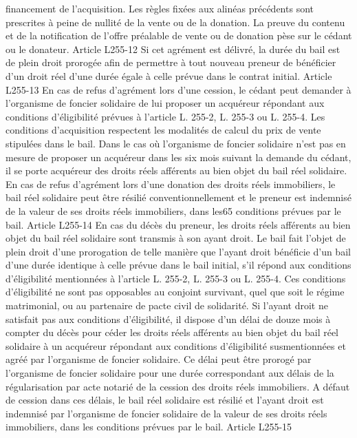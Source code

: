 \documentclass[11pt,a4paper]{report}
\begin{document}
financement de l'acquisition.
Les règles fixées aux alinéas précédents sont prescrites à peine de nullité de la vente ou de la donation. La
preuve du contenu et de la notification de l'offre préalable de vente ou de donation pèse sur le cédant ou le
donateur.
Article L255-12
Si cet agrément est délivré, la durée du bail est de plein droit prorogée afin de permettre à tout nouveau preneur
de bénéficier d'un droit réel d'une durée égale à celle prévue dans le contrat initial.
Article L255-13
En cas de refus d'agrément lors d'une cession, le cédant peut demander à l'organisme de foncier solidaire de lui
proposer un acquéreur répondant aux conditions d'éligibilité prévues à l'article L. 255-2, L. 255-3 ou L. 255-4.
Les conditions d'acquisition respectent les modalités de calcul du prix de vente stipulées dans le bail. Dans le
cas où l'organisme de foncier solidaire n'est pas en mesure de proposer un acquéreur dans les six mois suivant
la demande du cédant, il se porte acquéreur des droits réels afférents au bien objet du bail réel solidaire.
En cas de refus d'agrément lors d'une donation des droits réels immobiliers, le bail réel solidaire peut être
résilié conventionnellement et le preneur est indemnisé de la valeur de ses droits réels immobiliers, dans les65
conditions prévues par le bail.
Article L255-14
En cas du décès du preneur, les droits réels afférents au bien objet du bail réel solidaire sont transmis à son
ayant droit. Le bail fait l'objet de plein droit d'une prorogation de telle manière que l'ayant droit bénéficie d'un
bail d'une durée identique à celle prévue dans le bail initial, s'il répond aux conditions d'éligibilité mentionnées
à l'article L. 255-2, L. 255-3 ou L. 255-4.
Ces conditions d'éligibilité ne sont pas opposables au conjoint survivant, quel que soit le régime matrimonial, ou
au partenaire de pacte civil de solidarité.
Si l'ayant droit ne satisfait pas aux conditions d'éligibilité, il dispose d'un délai de douze mois à compter du
décès pour céder les droits réels afférents au bien objet du bail réel solidaire à un acquéreur répondant aux
conditions d'éligibilité susmentionnées et agréé par l'organisme de foncier solidaire. Ce délai peut être prorogé
par l'organisme de foncier solidaire pour une durée correspondant aux délais de la régularisation par acte
notarié de la cession des droits réels immobiliers. A défaut de cession dans ces délais, le bail réel solidaire est
résilié et l'ayant droit est indemnisé par l'organisme de foncier solidaire de la valeur de ses droits réels
immobiliers, dans les conditions prévues par le bail.
Article L255-15
\end{document}
